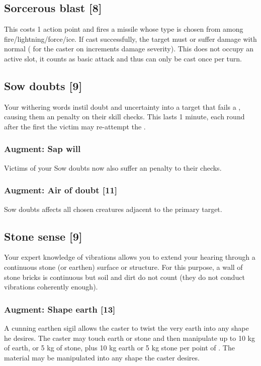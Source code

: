 \subsection{Sorcerous blast [8]}
\label{spell:sorc-blast}
This costs 1 action point and fires a missile whose type is chosen from among fire/lightning/force/ice. If cast successfully, the target must  or suffer damage with normal  ( for the caster on  increments damage severity). This does not occupy an active  slot, it counts as basic attack and thus can only be cast once per turn.

\subsection{Sow doubts [9]}
Your withering words instil doubt and uncertainty into a target that fails a , causing them an  penalty on their skill checks. This lasts 1 minute, each round after the first the victim may re-attempt the . 
\subsubsection{Augment: Sap will}
Victims of your Sow doubts now also suffer an  penalty to their  checks.
\subsubsection{Augment: Air of doubt [11]}
Sow doubts affects all chosen creatures adjacent to the primary target.

\subsection{Stone sense [9]}
\label{spell:stone-sense}
Your expert knowledge of vibrations allows you to extend your hearing through a continuous stone (or earthen) surface or structure. For this purpose, a wall of stone bricks is continuous but soil and dirt do not count (they do not conduct vibrations coherently enough). 
\subsubsection{Augment: Shape earth [13]}
A cunning earthen sigil allows the caster to twist the very earth into any shape he desires. The caster may touch earth or stone and then manipulate up to 10 kg of earth, or 5 kg of stone, plus 10 kg earth or 5 kg stone per point of . The material may be manipulated into any shape the caster desires.

